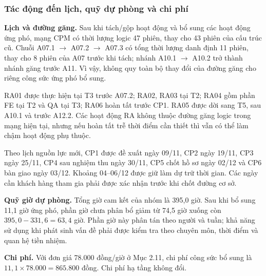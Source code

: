 \subsubsection{Tác động đến lịch, quỹ dự phòng và chi phí}

\textbf{Lịch và đường găng.} Sau khi tách/gộp hoạt động và bổ sung các hoạt động ứng phó, mạng CPM có thời lượng logic 47 phiên, thay cho 43 phiên của cấu trúc cũ. Chuỗi A07.1 $\to$ A07.2 $\to$ A07.3 có tổng thời lượng danh định 11 phiên, thay cho 8 phiên của A07 trước khi tách; nhánh A10.1 $\to$ A10.2 trở thành nhánh găng trước A11. Vì vậy, không quy toàn bộ thay đổi của đường găng cho riêng công sức ứng phó bổ sung.

RA01 được thực hiện tại T3 trước A07.2; RA02, RA03 tại T2; RA04 gồm phần FE tại T2 và QA tại T3; RA06 hoàn tất trước CP1. RA05 được dời sang T5, sau A10.1 và trước A12.2. Các hoạt động RA không thuộc đường găng logic trong mạng hiện tại, nhưng nếu hoàn tất trễ thời điểm cần thiết thì vẫn có thể làm chậm hoạt động phụ thuộc.

Theo lịch nguồn lực mới, CP1 được đề xuất ngày 09/11, CP2 ngày 19/11, CP3 ngày 25/11, CP4 sau nghiệm thu ngày 30/11, CP5 chốt hồ sơ ngày 02/12 và CP6 bàn giao ngày 03/12. Khoảng 04--06/12 được giữ làm dự trữ thời gian. Các ngày cần khách hàng tham gia phải được xác nhận trước khi chốt đường cơ sở.

\textbf{Quỹ giờ dự phòng.} Tổng giờ cam kết của nhóm là 395,0 giờ. Sau khi bổ sung 11,1 giờ ứng phó, phần giờ chưa phân bổ giảm từ 74,5 giờ xuống còn $395{,}0 - 331{,}6 = 63{,}4$ giờ. Phần giờ này phân tán theo người và tuần; khả năng sử dụng khi phát sinh vấn đề phải được kiểm tra theo chuyên môn, thời điểm và quan hệ tiền nhiệm.

\textbf{Chi phí.} Với đơn giá 78.000 đồng/giờ ở Mục 2.11, chi phí công sức bổ sung là $11{,}1 \times 78.000 = 865.800$ đồng. Chi phí hạ tầng không đổi.

